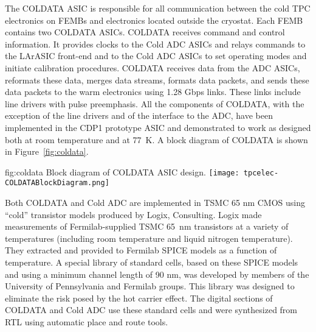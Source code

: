 The COLDATA ASIC is responsible for all communication between the cold TPC electronics on FEMBs and electronics located outside the cryostat.  Each FEMB contains two COLDATA ASICs. COLDATA receives command and control information.  It provides clocks to the Cold ADC ASICs and relays commands to the LArASIC front-end and to the Cold ADC ASICs to set operating modes and initiate calibration procedures.  COLDATA receives data from the ADC ASICs, reformats these data, merges data streams, formats data packets, and sends these data packets to the warm electronics using 1.28 Gbps links.  These links include line drivers with pulse preemphasis.  All the components of COLDATA, with the exception of the line drivers and of the interface to the ADC, have been implemented in the CDP1 prototype ASIC and demonstrated to work as designed both at room temperature and at 77~K.  A block diagram of COLDATA is shown in Figure~\ref{fig:coldata}.  

\begin{dunefigure}
{fig:coldata}
{Block diagram of COLDATA ASIC design.}
\texttt{[image: tpcelec-COLDATABlockDiagram.png]}
\end{dunefigure}

Both COLDATA and Cold ADC are implemented in TSMC 65 nm CMOS using ``cold'' transistor models produced by Logix, Consulting.  Logix made measurements of Fermilab-supplied TSMC 65~nm transistors at a variety of temperatures (including room temperature and liquid nitrogen temperature).  They extracted and provided to Fermilab SPICE models as a function of temperature.  A special library of standard cells, based on these SPICE models and using a minimum channel length of 90 nm, was developed by members of the University of Pennsylvania and Fermilab groups.  This library was designed to eliminate the risk posed by the hot carrier effect.  The digital sections of COLDATA and Cold ADC use these standard cells and were synthesized from RTL using automatic place and route tools.

